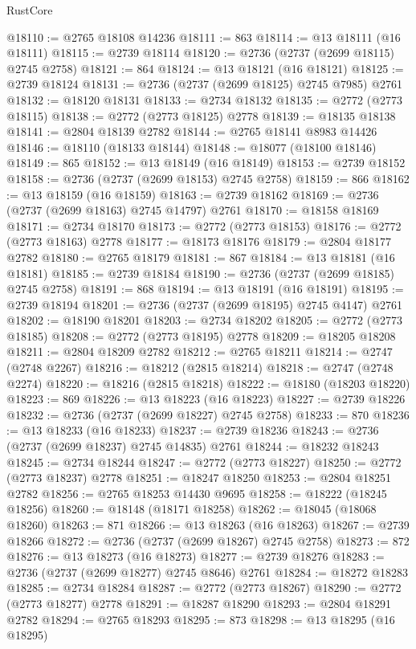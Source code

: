 \begin{lexlean}{RustCore}
\begin{coremodule}
@18110 := @2765 @18108 @14236
@18111 := 863
@18114 := @13 @18111 (@16 @18111)
@18115 := @2739 @18114
@18120 := @2736 (@2737 (@2699 @18115) @2745 @2758)
@18121 := 864
@18124 := @13 @18121 (@16 @18121)
@18125 := @2739 @18124
@18131 := @2736 (@2737 (@2699 @18125) @2745 @7985) @2761
@18132 := @18120 @18131
@18133 := @2734 @18132
@18135 := @2772 (@2773 @18115)
@18138 := @2772 (@2773 @18125) @2778
@18139 := @18135 @18138
@18141 := @2804 @18139 @2782
@18144 := @2765 @18141 @8983 @14426
@18146 := @18110 (@18133 @18144)
@18148 := @18077 (@18100 @18146)
@18149 := 865
@18152 := @13 @18149 (@16 @18149)
@18153 := @2739 @18152
@18158 := @2736 (@2737 (@2699 @18153) @2745 @2758)
@18159 := 866
@18162 := @13 @18159 (@16 @18159)
@18163 := @2739 @18162
@18169 := @2736 (@2737 (@2699 @18163) @2745 @14797) @2761
@18170 := @18158 @18169
@18171 := @2734 @18170
@18173 := @2772 (@2773 @18153)
@18176 := @2772 (@2773 @18163) @2778
@18177 := @18173 @18176
@18179 := @2804 @18177 @2782
@18180 := @2765 @18179
@18181 := 867
@18184 := @13 @18181 (@16 @18181)
@18185 := @2739 @18184
@18190 := @2736 (@2737 (@2699 @18185) @2745 @2758)
@18191 := 868
@18194 := @13 @18191 (@16 @18191)
@18195 := @2739 @18194
@18201 := @2736 (@2737 (@2699 @18195) @2745 @4147) @2761
@18202 := @18190 @18201
@18203 := @2734 @18202
@18205 := @2772 (@2773 @18185)
@18208 := @2772 (@2773 @18195) @2778
@18209 := @18205 @18208
@18211 := @2804 @18209 @2782
@18212 := @2765 @18211
@18214 := @2747 (@2748 @2267)
@18216 := @18212 (@2815 @18214)
@18218 := @2747 (@2748 @2274)
@18220 := @18216 (@2815 @18218)
@18222 := @18180 (@18203 @18220)
@18223 := 869
@18226 := @13 @18223 (@16 @18223)
@18227 := @2739 @18226
@18232 := @2736 (@2737 (@2699 @18227) @2745 @2758)
@18233 := 870
@18236 := @13 @18233 (@16 @18233)
@18237 := @2739 @18236
@18243 := @2736 (@2737 (@2699 @18237) @2745 @14835) @2761
@18244 := @18232 @18243
@18245 := @2734 @18244
@18247 := @2772 (@2773 @18227)
@18250 := @2772 (@2773 @18237) @2778
@18251 := @18247 @18250
@18253 := @2804 @18251 @2782
@18256 := @2765 @18253 @14430 @9695
@18258 := @18222 (@18245 @18256)
@18260 := @18148 (@18171 @18258)
@18262 := @18045 (@18068 @18260)
@18263 := 871
@18266 := @13 @18263 (@16 @18263)
@18267 := @2739 @18266
@18272 := @2736 (@2737 (@2699 @18267) @2745 @2758)
@18273 := 872
@18276 := @13 @18273 (@16 @18273)
@18277 := @2739 @18276
@18283 := @2736 (@2737 (@2699 @18277) @2745 @8646) @2761
@18284 := @18272 @18283
@18285 := @2734 @18284
@18287 := @2772 (@2773 @18267)
@18290 := @2772 (@2773 @18277) @2778
@18291 := @18287 @18290
@18293 := @2804 @18291 @2782
@18294 := @2765 @18293
@18295 := 873
@18298 := @13 @18295 (@16 @18295)

\end{coremodule}
\end{lexlean}
